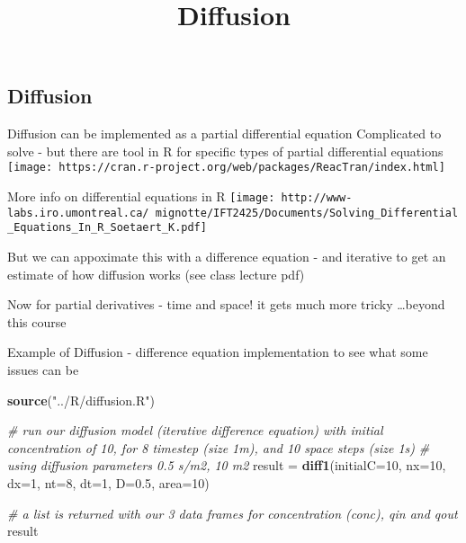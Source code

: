 \documentclass[
]{article}
\title{Diffusion}
\author{}
\date{\vspace{-2.5em}}
\newenvironment{Shaded}{\begin{snugshade}}{\end{snugshade}}
\newcommand{\CommentTok}[1]{\textcolor[rgb]{0.56,0.35,0.01}{\textit{#1}}}
\newcommand{\DataTypeTok}[1]{\textcolor[rgb]{0.13,0.29,0.53}{#1}}
\newcommand{\DecValTok}[1]{\textcolor[rgb]{0.00,0.00,0.81}{#1}}
\newcommand{\FloatTok}[1]{\textcolor[rgb]{0.00,0.00,0.81}{#1}}
\newcommand{\KeywordTok}[1]{\textcolor[rgb]{0.13,0.29,0.53}{\textbf{#1}}}
\newcommand{\NormalTok}[1]{#1}
\newcommand{\StringTok}[1]{\textcolor[rgb]{0.31,0.60,0.02}{#1}}
\begin{document}
\maketitle

\hypertarget{diffusion}{%
\subsection{Diffusion}\label{diffusion}}

Diffusion can be implemented as a partial differential equation
Complicated to solve - but there are tool in R for specific types of
partial differential equations
\texttt{[image: https://cran.r-project.org/web/packages/ReacTran/index.html]}

More info on differential equations in R
\texttt{[image: http://www-labs.iro.umontreal.ca/~mignotte/IFT2425/Documents/Solving\_Differential\_Equations\_In\_R\_Soetaert\_K.pdf]}

But we can appoximate this with a difference equation - and iterative to
get an estimate of how diffusion works (see class lecture pdf)

Now for partial derivatives - time and space! it gets much more tricky
\ldots beyond this course

Example of Diffusion - difference equation implementation to see what
some issues can be

\begin{Shaded}
\begin{Highlighting}[]
\KeywordTok{source}\NormalTok{(}\StringTok{"../R/diffusion.R"}\NormalTok{)}

\CommentTok{# run our diffusion model (iterative difference equation) with initial concentration of 10, for 8 timestep (size 1m), and 10 space steps (size 1s)}
\CommentTok{# using diffusion parameters 0.5 s/m2, 10 m2}
\NormalTok{result =}\StringTok{ }\KeywordTok{diff1}\NormalTok{(}\DataTypeTok{initialC=}\DecValTok{10}\NormalTok{, }\DataTypeTok{nx=}\DecValTok{10}\NormalTok{, }\DataTypeTok{dx=}\DecValTok{1}\NormalTok{, }\DataTypeTok{nt=}\DecValTok{8}\NormalTok{, }\DataTypeTok{dt=}\DecValTok{1}\NormalTok{, }\DataTypeTok{D=}\FloatTok{0.5}\NormalTok{, }\DataTypeTok{area=}\DecValTok{10}\NormalTok{)}

\CommentTok{# a list is returned with our 3 data frames for concentration (conc), qin and qout}
\NormalTok{result}
\end{Highlighting}
\end{Shaded}
\end{document}

